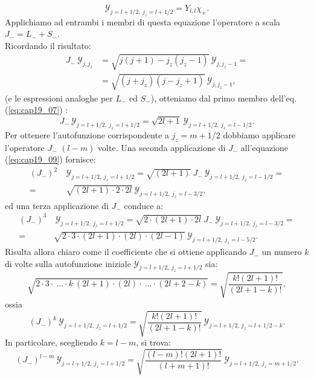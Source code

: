 \begin{equation} \label{eq:cap19_07}
 \mathcal{Y}_{j=l+1/2,~j_z=l+1/2} = Y_{l,l} \chi_+ .
\end{equation}
Applichiamo ad entrambi i membri di questa equazione l'operatore a scala $J_- = L_-+S_-$.\\
Ricordando il risultato:
\begin{align} \label{eq:cap19_08}
J_-~ \mathcal{Y}_{j,j_z} &= \sqrt{j(j+1)-j_z(j_z-1)}~\mathcal{Y}_{j,j_z-1} = \\ \nonumber
&= \sqrt{(j+j_z)(j-j_z+1)}~\mathcal{Y}_{j,j_z-1} ,
\end{align}
(e le espressioni analoghe per $L_-$ ed $S_-$), otteniamo dal primo membro dell'eq. (\ref{eq:cap19_07}) :
\begin{equation} \label{eq:cap19_09}
J_-~ \mathcal{Y}_{j=l+1/2,~j_z=l+1/2} = \sqrt{2l+1}~\mathcal{Y}_{j=l+1/2,~j_z=l-1/2} .
\end{equation}
Per ottenere l'autofunzione corrispondente a $j_z=m+1/2$ dobbiamo applicare l'operatore $J_-$ $(l-m)$ volte. Una seconda applicazione di $J_-$ all'equazione (\ref{eq:cap19_09}) fornisce:
\begin{align}
(J_-)^2~&\mathcal{Y}_{j=l+1/2,~j_z=l+1/2} = \sqrt{(2l+1)}~J_-~\mathcal{Y}_{j=l+1/2,~j_z=l-1/2} = \nonumber \\
=~ &\sqrt{(2l+1)\cdot 2 \cdot 2l}~\mathcal{Y}_{j=l+1/2,~j_z=l-3/2},
\end{align}
ed una terza applicazione di $J_-$ conduce a:
\begin{align}
(J_-)^3&~\mathcal{Y}_{j=l+1/2,~j_z=l+1/2} = \sqrt{2\cdot(2l+1)\cdot 2l}~J_-~\mathcal{Y}_{j=l+1/2,~j_z=l-3/2} = \nonumber\\
=~&\sqrt{2\cdot 3\cdot(2l+1) \cdot (2l) \cdot (2l-1)}~\mathcal{Y}_{j=l+1/2,~j_z=l-5/2}.
\end{align}
Risulta allora chiaro come il coefficiente che si ottiene applicando $J_-$ un numero $k$ di volte sulla autofunzione iniziale $\mathcal{Y}_{j=l+1/2,~j_z=l+1/2}$ sia:
\begin{equation}
\sqrt{2\cdot 3\cdot~...\cdot k~(2l+1) \cdot (2l) \cdot ~...\cdot(2l+2-k)} = \sqrt{\frac{k! (2l+1)!}{(2l+1-k)!}},
\end{equation}
ossia
\begin{equation} \label{eq:cap19_10}
(J_-)^k~\mathcal{Y}_{j=l+1/2,~j_z=l+1/2} = \sqrt{\frac{k! (2l+1)!}{(2l+1-k)!}}~\mathcal{Y}_{j=l+1/2,~j_z=l+1/2-k}.
\end{equation}
In particolare, scegliendo $k=l-m$, si trova:
\begin{equation} \label{eq:cap19_11}
(J_-)^{l-m}~\mathcal{Y}_{j=l+1/2,~j_z=l+1/2} = \sqrt{\frac{(l-m)! (2l+1)!}{(l+m+1)!}}~\mathcal{Y}_{j=l+1/2,~j_z=m+1/2}.
\end{equation}
